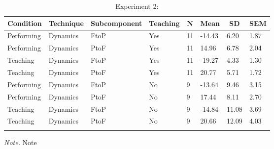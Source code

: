 \documentclass[
  man,floatsintext]{apa6}
\begin{document}
\begin{table}[tbp]

\begin{center}
\begin{threeparttable}

\caption{\label{tab:dyn-diff-teaching-desc-2}Experiment 2:}

\begin{tabular}{llllllll}
\toprule
Condition & \multicolumn{1}{c}{Technique} & \multicolumn{1}{c}{Subcomponent} & \multicolumn{1}{c}{Teaching} & \multicolumn{1}{c}{N} & \multicolumn{1}{c}{Mean} & \multicolumn{1}{c}{SD} & \multicolumn{1}{c}{SEM}\\
\midrule
Performing & Dynamics & FtoP & Yes & 11 & -14.43 & 6.20 & 1.87\\
Performing & Dynamics & PtoF & Yes & 11 & 14.96 & 6.78 & 2.04\\
Teaching & Dynamics & FtoP & Yes & 11 & -19.27 & 4.33 & 1.30\\
Teaching & Dynamics & PtoF & Yes & 11 & 20.77 & 5.71 & 1.72\\
Performing & Dynamics & FtoP & No & 9 & -13.64 & 9.46 & 3.15\\
Performing & Dynamics & PtoF & No & 9 & 17.44 & 8.11 & 2.70\\
Teaching & Dynamics & FtoP & No & 9 & -14.84 & 11.08 & 3.69\\
Teaching & Dynamics & PtoF & No & 9 & 20.66 & 12.09 & 4.03\\
\bottomrule
\addlinespace
\end{tabular}

\begin{tablenotes}[para]
\normalsize{\textit{Note.} Note}
\end{tablenotes}

\end{threeparttable}
\end{center}

\end{table}
\end{document}
